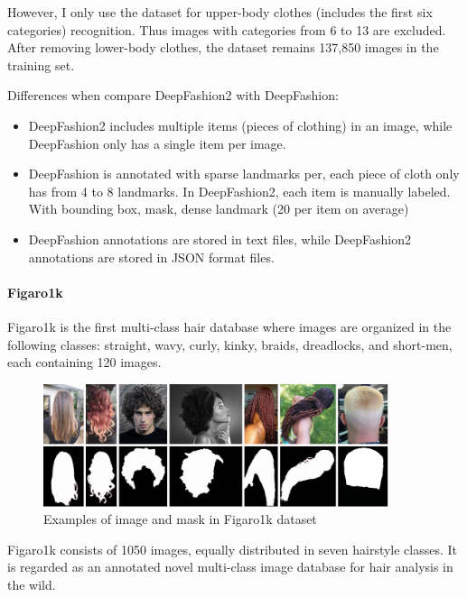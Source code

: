 However, I only use the dataset for upper-body clothes (includes the first six categories) recognition. Thus images with categories from 6 to 13 are excluded. After removing lower-body clothes, the dataset remains 137,850 images in the training set. \par


\noindent Differences when compare DeepFashion2 with DeepFashion:
\begin{itemize}
\item DeepFashion2 includes multiple items (pieces of clothing) in an image, while DeepFashion only has a single item per image.
\item DeepFashion is annotated with sparse landmarks per, each piece of cloth only has from 4 to 8 landmarks. In DeepFashion2, each item is manually labeled. With bounding box, mask, dense landmark (20 per item on average)
\item DeepFashion annotations are stored in text files, while DeepFashion2 annotations are stored in JSON format files.
\end{itemize}


\paragraph{Figaro1k}

Figaro1k is the first multi-class hair database where images are organized in the following classes: straight, wavy, curly, kinky, braids, dreadlocks, and short-men, each containing 120 images. \par

\begin{figure} [H]
    \centering
    \includegraphics[width=0.9\textwidth]{chapter4/image/figaro.png}
    \caption{Examples of image and mask in Figaro1k dataset}
    \label{fig:figaro}
\end{figure}

Figaro1k consists of 1050 images, equally distributed in seven hairstyle classes. It is regarded as an annotated novel multi-class image database for hair analysis in the wild.

